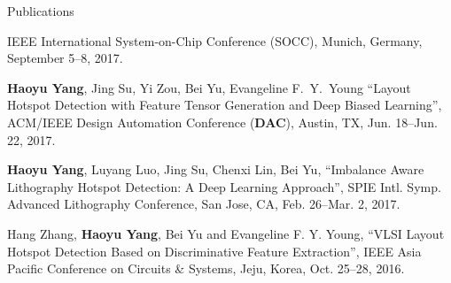 \begin{rSection}{Publications}
\begin{description}[font=\normalfont]
{		IEEE International System-on-Chip Conference (SOCC), Munich, Germany, September 5--8, 2017. 
	}
	\item[{[C3]}]{
		\textbf{Haoyu Yang}, Jing Su, Yi Zou, Bei Yu, Evangeline F.~Y.~Young
		``Layout Hotspot Detection with Feature Tensor Generation and Deep Biased Learning'',
		ACM/IEEE Design Automation Conference (\textbf{DAC}), Austin, TX, Jun. 18--Jun. 22, 2017. 
	}
	\item[{[C2]}]{
		\textbf{Haoyu Yang}, Luyang Luo, Jing Su, Chenxi Lin, Bei Yu,
		``Imbalance Aware Lithography Hotspot Detection: A Deep Learning Approach'',
		SPIE Intl. Symp. Advanced Lithography Conference, San Jose, CA, Feb. 26--Mar. 2, 2017. 
	}
	\item[{[C1]}]{
		Hang Zhang, \textbf{Haoyu Yang}, Bei Yu and Evangeline F. Y. Young,
		``VLSI Layout Hotspot Detection Based on Discriminative Feature Extraction'',
		IEEE Asia Pacific Conference on Circuits \& Systems, Jeju, Korea, Oct. 25--28, 2016.
	}
\end{description}



\fi




\end{rSection}

